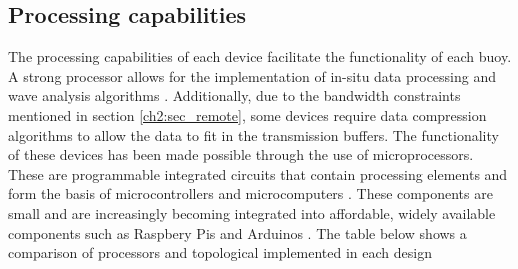 \subsection{Processing capabilities}
The processing capabilities of each device facilitate the functionality of each buoy. A strong processor allows for the implementation of in-situ data processing and wave analysis algorithms \cite{kohout2015device,rabault2019open}. Additionally, due to the bandwidth constraints mentioned in section \ref{ch2:sec_remote}, some devices require data compression algorithms to allow the data to fit in the transmission buffers. The functionality of these devices has been made possible through the use of microprocessors. These are programmable integrated circuits that contain processing elements \cite{subham2018micro} and form the basis of microcontrollers and microcomputers \cite{crisp2003introduction}. These components are small and are increasingly becoming integrated into affordable, widely available components such as Raspbery Pis and Arduinos \cite{rabault2019open}. The table below shows a comparison of processors and topological implemented in each design

